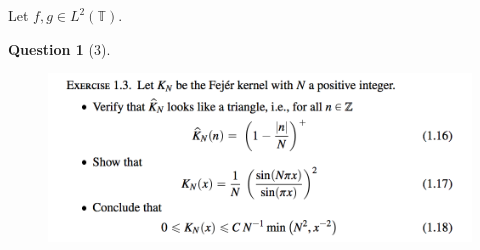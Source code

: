 \documentclass{article} %
\theoremstyle{quest}
\newtheorem*{question}{Question}
\begin{document}
Let $f,g \in L^{2}(\mathbb{T})$. 
\newpage

\begin{question}[3]
\hfill
\begin{figure}[h!]
  \centering
    \includegraphics[width=1\textwidth]{HA-1-3.png}
\end{figure}
\end{question}
\end{document}
